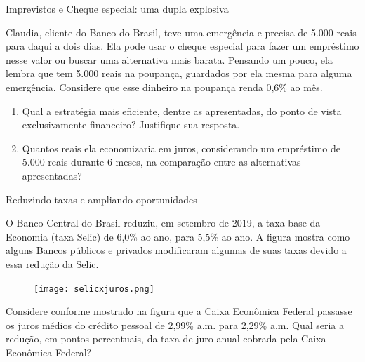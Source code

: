 

\begin{task}{Imprevistos e Cheque especial: uma dupla explosiva}

Claudia, cliente do Banco do Brasil, teve uma emergência e precisa de 5.000 reais para daqui a dois dias. Ela pode usar o cheque especial para fazer um empréstimo nesse valor ou buscar uma alternativa mais barata. Pensando um pouco, ela lembra que tem 5.000 reais na poupança, guardados por ela mesma para alguma emergência. Considere que esse dinheiro na poupança renda 0,6\% ao mês. 

\begin{enumerate}
\item Qual a estratégia mais eficiente, dentre as apresentadas, do ponto de vista exclusivamente financeiro? Justifique sua resposta. 
\item Quantos reais ela economizaria em juros, considerando um empréstimo de 5.000 reais durante 6 meses, na comparação entre as alternativas apresentadas?
\end{enumerate}
\end{task}

\begin{task}{Reduzindo taxas e ampliando oportunidades}

O Banco Central do Brasil reduziu, em setembro de 2019, a taxa base da Economia (taxa Selic) de 6,0\% ao ano, para 5,5\% ao ano. A figura mostra como alguns Bancos públicos e privados modificaram algumas de suas taxas devido a essa redução da Selic. 

\begin{figure}[H]
\centering
\texttt{[image: selicxjuros.png]}

\end{figure}

Considere conforme mostrado na figura que a Caixa Econômica Federal passasse os juros médios do crédito pessoal de 2,99\% a.m. para 2,29\% a.m. Qual seria a redução, em pontos percentuais, da taxa de juro anual cobrada pela Caixa Econômica Federal?
\end{task}


